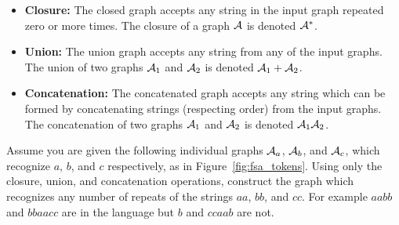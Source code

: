 \begin{itemize}
    \item {\bf Closure:} The closed graph accepts any string in the input graph
        repeated zero or more times. The closure of a graph $\mathcal{A}$ is denoted
        $\mathcal{A}^*$.

    \item {\bf Union:} The union graph accepts any string from any of the input
        graphs. The union of two graphs $\mathcal{A}_1$ and $\mathcal{A}_2$ is denoted $\mathcal{A}_1 +
        \mathcal{A}_2$.

    \item {\bf Concatenation:} The concatenated graph accepts any string which
        can be formed by concatenating strings (respecting order) from the
        input graphs. The concatenation of two graphs $\mathcal{A}_1$ and $\mathcal{A}_2$ is
        denoted $\mathcal{A}_1\mathcal{A}_2$.

\end{itemize}

\begin{example}
Assume you are given the following individual graphs $\mathcal{A}_a$, $\mathcal{A}_b$, and
$\mathcal{A}_c$, which recognize $a$, $b$, and $c$ respectively, as in
Figure~\ref{fig:fsa_tokens}. Using only the closure, union, and
concatenation operations, construct the graph which recognizes any number
of repeats of the strings $aa$, $bb$, and $cc$. For example $aabb$ and
$bbaacc$ are in the language but $b$ and $ccaab$ are not.
\end{example}

